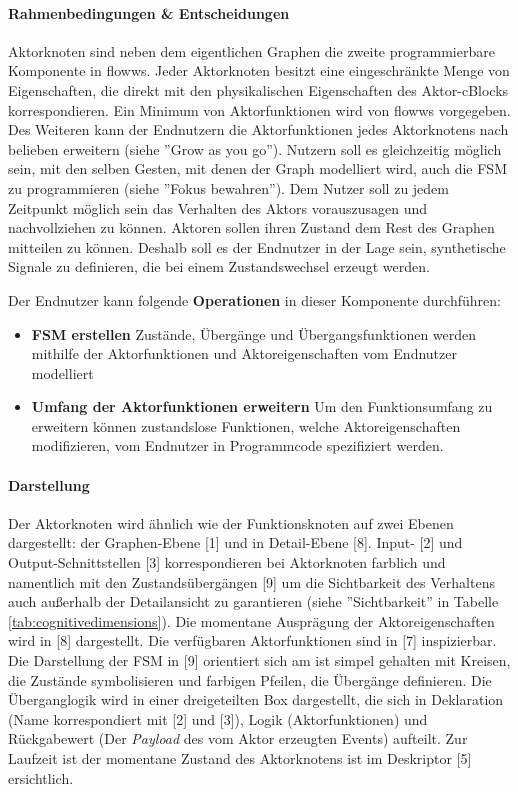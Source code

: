 \paragraph{Rahmenbedingungen \& Entscheidungen} Aktorknoten sind neben dem eigentlichen Graphen die zweite programmierbare Komponente in flowws. Jeder Aktorknoten besitzt eine eingeschränkte Menge von Eigenschaften, die direkt mit den physikalischen Eigenschaften des Aktor-cBlocks korrespondieren. Ein Minimum von Aktorfunktionen wird von flowws vorgegeben. Des Weiteren kann der Endnutzern die Aktorfunktionen jedes Aktorknotens nach belieben erweitern (siehe ''Grow as you go''). Nutzern soll es gleichzeitig möglich sein, mit den selben Gesten, mit denen der Graph modelliert wird, auch die \ac{FSM} zu programmieren (siehe ''Fokus bewahren''). Dem Nutzer soll zu jedem Zeitpunkt möglich sein das Verhalten des Aktors vorauszusagen und nachvollziehen zu können. Aktoren sollen ihren Zustand dem Rest des Graphen mitteilen zu können. Deshalb soll es der Endnutzer in der Lage sein, synthetische Signale zu definieren, die bei einem Zustandswechsel erzeugt werden.

Der Endnutzer kann folgende \textbf{Operationen} in dieser Komponente durchführen: 
\begin{itemize}
    \item \textbf{\ac{FSM} erstellen} Zustände, Übergänge und Übergangsfunktionen werden mithilfe der Aktorfunktionen und Aktoreigenschaften vom Endnutzer modelliert
    \item \textbf{Umfang der Aktorfunktionen erweitern} Um den Funktionsumfang zu erweitern können zustandslose Funktionen, welche Aktoreigenschaften modifizieren, vom Endnutzer in Programmcode spezifiziert werden.
\end{itemize}

\paragraph{Darstellung} Der Aktorknoten wird ähnlich wie der Funktionsknoten auf zwei Ebenen dargestellt: der Graphen-Ebene [1] und in Detail-Ebene [8]. Input- [2] und Output-Schnittstellen [3] korrespondieren bei Aktorknoten farblich und namentlich mit den Zustandsübergängen [9] um die Sichtbarkeit des Verhaltens auch außerhalb der Detailansicht zu garantieren (siehe ''Sichtbarkeit'' in Tabelle \ref{tab:cognitivedimensions}). Die momentane Ausprägung der Aktoreigenschaften wird in [8] dargestellt. Die verfügbaren Aktorfunktionen sind in [7] inspizierbar. Die Darstellung der \ac{FSM} in [9] orientiert sich am ist simpel gehalten mit Kreisen, die Zustände symbolisieren und farbigen Pfeilen, die Übergänge definieren. Die Überganglogik wird in einer dreigeteilten Box dargestellt, die sich in Deklaration (Name korrespondiert mit [2] und [3]), Logik (Aktorfunktionen) und Rückgabewert (Der \textit{Payload} des vom Aktor erzeugten Events) aufteilt. Zur Laufzeit ist der momentane Zustand des Aktorknotens ist im Deskriptor [5] ersichtlich.

